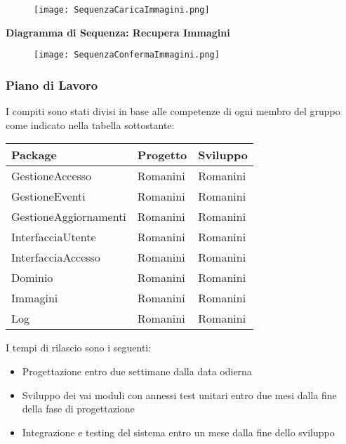 \begin{figure}[h!]
    \begin{center}
        \texttt{[image: SequenzaCaricaImmagini.png]}
    \end{center}
\end{figure}
\hfill \break

\textbf{Diagramma di Sequenza: Recupera Immagini}

\begin{figure}[h!]
    \begin{center}
        \texttt{[image: SequenzaConfermaImmagini.png]}
    \end{center}
\end{figure}
\hfill \break
\clearpage

\newpage

\subsubsection{Piano di Lavoro}

I compiti sono stati divisi in base alle competenze di
ogni membro del gruppo come indicato nella tabella sottostante:
\hfill \break

\begin{tabular} {|P{6cm}|P{4.5cm}|P{4.5cm}|}
    \hline
    \textbf{Package}      & \textbf{Progetto} & \textbf{Sviluppo} \\
    \hline
    GestioneAccesso       & Romanini          & Romanini          \\
    \hline
    GestioneEventi        & Romanini          & Romanini          \\
    \hline
    GestioneAggiornamenti & Romanini          & Romanini          \\
    \hline
    InterfacciaUtente     & Romanini          & Romanini          \\
    \hline
    InterfacciaAccesso    & Romanini          & Romanini          \\
    \hline
    Dominio               & Romanini          & Romanini          \\
    \hline
    Immagini              & Romanini          & Romanini          \\
    \hline
    Log                   & Romanini          & Romanini          \\
    \hline
\end{tabular}
\hfill \break

I tempi di rilascio sono i seguenti:
\begin{itemize}
    \item Progettazione entro due settimane dalla data odierna
    \item Sviluppo dei vai moduli con annessi test unitari entro due mesi dalla fine della fase di progettazione
    \item Integrazione e testing del sistema entro un mese dalla fine dello sviluppo
\end{itemize}
\hfill \break

